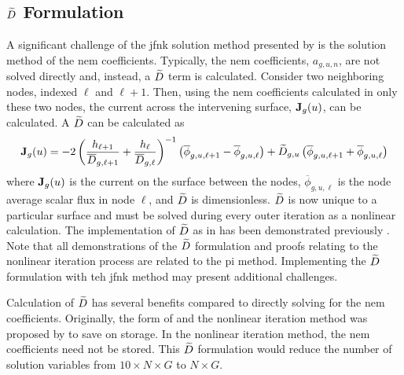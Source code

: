   \subsection{\texorpdfstring{$\widetilde{D}$ Formulation}{D\textasciitilde \ Formulation}}
    \label{sec:dtilde_formulation}

    A significant challenge of the \gls{jfnk} solution method presented by
    \citeauthor{qe2paper} is the solution method of the \gls{nem} coefficients.
    Typically, the \gls{nem} coefficients, $a_{g,u,n}$, are not solved directly
    and, instead, a $\widetilde{D}$ term is calculated. Consider two neighboring
    nodes, indexed $\ell$ and $\ell+1$. Then, using the \gls{nem} coefficients
    calculated in only these two nodes, the current across the intervening
    surface, $\mathbf{J}_g(u)$, can be calculated. A $\widetilde{D}$ can be calculated
    as
    \begin{equation}
      \label{eq:dtilde}
      \mathbf{J}_g(u) = 
        -2 \left( \frac{h_{\ell+1}}{\overline{D}_{g,\ell+1}} + 
          \frac{h_{\ell}}{\overline{D}_{g,\ell}} \right)^{-1}
          \left( \overline{\phi}_{g,u,\ell+1} -
          \overline{\phi}_{g,u,\ell} \right) + 
        \widetilde{D}_{g,u} \left( \overline{\phi}_{g,u,\ell+1} +
          \overline{\phi}_{g,u,\ell} \right)
    \end{equation}
    where $\mathbf{J}_g(u)$ is the current on the surface between the nodes,
    $\overline{\phi}_{g,u,\ell}$ is the node average scalar flux in node $\ell$,
    and $\widetilde{D}$ is dimensionless. $\widetilde{D}$ is now unique to a particular
    surface and must be solved during every outer iteration as a nonlinear
    calculation. The implementation of $\widetilde{D}$ as in  has been
    demonstrated previously \cite{smith_nonlinear,palmtagThesis}. Note that all
    demonstrations of the $\widetilde{D}$ formulation and proofs relating to the
    nonlinear iteration process are related to the \gls{pi} method. Implementing
    the $\widetilde{D}$ formulation with teh \gls{jfnk} method may present additional
    challenges.

    Calculation of $\widetilde{D}$ has several benefits compared to directly solving
    for the \gls{nem} coefficients. Originally, the form of  and
    the nonlinear iteration method was proposed by \citeauthor{smith_nonlinear}
    to save on storage. In the nonlinear iteration method, the \gls{nem}
    coefficients need not be stored. This $\widetilde{D}$ formulation would reduce the
    number of solution variables from $10 \times N \times G$ to $N \times G$.


